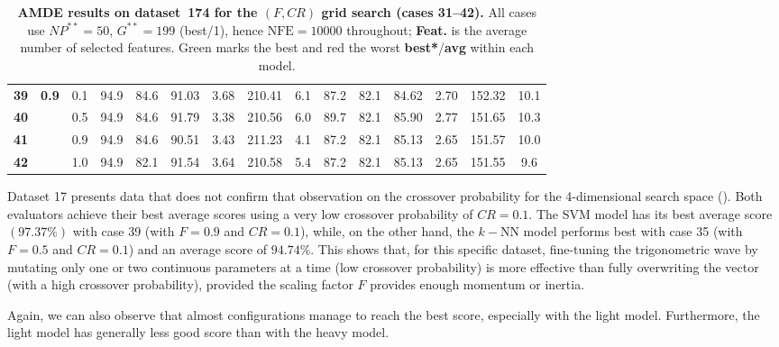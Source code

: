 \documentclass[12pt, openany]{article}
\begin{document}
\begin{table}[H]
{\begin{tabular}{|c c c | c c c c c c | c c c c c c |}
        \textbf{39} & \multirow{4}{*}{\textbf{0.9}} & 0.1 & \cellcolor{best}94.9 & 84.6 & 91.03 & 3.68 & 210.41 & 6.1 & \cellcolor{worst}87.2 & 82.1 & \cellcolor{worst}84.62 & 2.70 & 152.32 & 10.1 \\
        \textbf{40} &  & 0.5 & \cellcolor{best}94.9 & 84.6 & 91.79 & 3.38 & 210.56 & 6.0 & \cellcolor{best}89.7 & 82.1 & 85.90 & 2.77 & 151.65 & 10.3 \\
        \textbf{41} &  & 0.9 & \cellcolor{best}94.9 & 84.6 & 90.51 & 3.43 & 211.23 & 4.1 & \cellcolor{worst}87.2 & 82.1 & 85.13 & 2.65 & 151.57 & 10.0 \\
        \textbf{42} &  & 1.0 & \cellcolor{best}94.9 & 82.1 & 91.54 & 3.64 & 210.58 & 5.4 & \cellcolor{worst}87.2 & 82.1 & 85.13 & 2.65 & 151.55 & 9.6 \\
        \hline
    \end{tabular}
    }
    \caption{\textbf{AMDE results on dataset~174 for the $(F, CR)$ grid search (cases 31--42).} All cases use $NP^{**}{=}50$, $G^{**}{=}199$ (best/1), hence $\mathrm{NFE}=10000$ throughout; \textbf{Feat.} is the average number of selected features. Green marks the best and red the worst \textbf{best*}/\textbf{avg} within each model.}
    \label{tab:results_AMDE_FCR_d174}
\end{table}

Dataset 17 presents data that does not confirm that observation on the crossover probability for the 4-dimensional search space (). Both evaluators achieve their best average scores using a very low crossover probability of $CR=0.1$. The SVM model has its best average score $(97.37\%)$ with case 39 (with $F=0.9$ and $CR=0.1$), while, on the other hand, the $k-$NN model performs best with case 35 (with $F=0.5$ and $CR=0.1$) and an average score of $94.74\%$. This shows that, for this specific dataset, fine-tuning the trigonometric wave by mutating only one or two continuous parameters at a time (low crossover probability) is more effective than fully overwriting the vector (with a high crossover probability), provided the scaling factor $F$ provides enough momentum or inertia.

Again, we can also observe that almost configurations manage to reach the best score, especially with the light model. Furthermore, the light model has generally less good score than with the heavy model.
\end{document}
